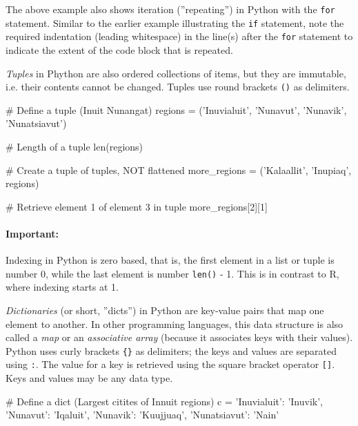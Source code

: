 The above example also shows iteration (''repeating'') in Python with the \texttt{for} statement. Similar to the earlier example illustrating the \texttt{if} statement, note the required indentation (leading whitespace) in the line(s) after the \texttt{for} statement to indicate the extent of the code block that is repeated.

\emph{Tuples} in Phython are also ordered collections of items, but they are immutable, i.e. their contents cannot be changed. Tuples use round brackets \texttt{()} as delimiters.

\begin{samepage}
\begin{pythoncode}
# Define a tuple (Inuit Nunangat)
regions = ('Inuvialuit', 'Nunavut', 'Nunavik', 'Nunatsiavut')

# Length of a tuple
len(regions)

# Create a tuple of tuples, NOT flattened
more_regions = ('Kalaallit', 'Inupiaq', regions)

# Retrieve element 1 of element 3 in tuple
more_regions[2][1]
\end{pythoncode}
\end{samepage}

\begin{tcolorbox}[colback=alert]
\paragraph*{Important:} Indexing in Python is zero based, that is, the first element in a list or tuple is number 0, while the last element is number \texttt{len()} - 1. This is in contrast to R, where indexing starts at 1.
\end{tcolorbox}

\emph{Dictionaries} (or short, ''dicts'') in Python are key-value pairs that map one element to another. In other programming languages, this data structure is also called a \emph{map} or an \emph{associative array} (because it associates keys with their values). Python uses curly brackets \texttt{\{\}} as delimiters; the keys and values are separated using \texttt{:}. The value for a key is retrieved using the square bracket operator \texttt{[]}. Keys and values may be any data type.

\begin{samepage}
\begin{pythoncode}
# Define a dict (Largest citites of Innuit regions)
c = {
    'Inuvialuit': 'Inuvik',
    'Nunavut': 'Iqaluit',
    'Nunavik': 'Kuujjuaq',
    'Nunatsiavut': 'Nain' 
}
\end{pythoncode}
\end{samepage}

